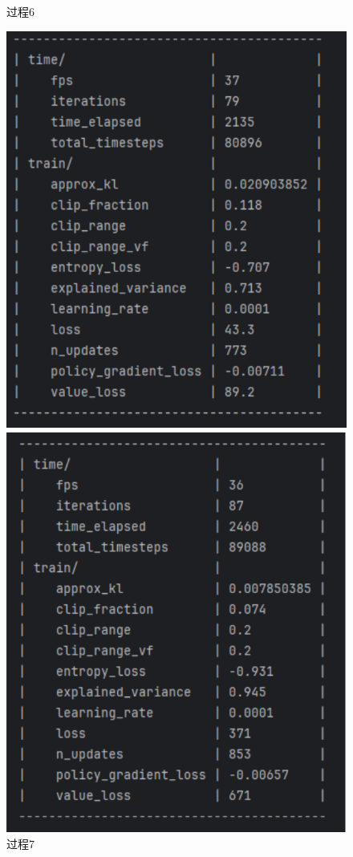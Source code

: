 \begin{figure}[H]
\begin{minipage}{0.24\textwidth}
        \caption{过程6}
    \end{minipage}%
    \begin{minipage}{0.24\textwidth}
        \centering
        \includegraphics[width=\textwidth]{images/training7.pdf}
        \caption{过程7}
    \end{minipage}%
    \begin{minipage}{0.24\textwidth}
        \centering
        \includegraphics[width=\textwidth]{images/training8.pdf}

\end{minipage}
\end{figure}
